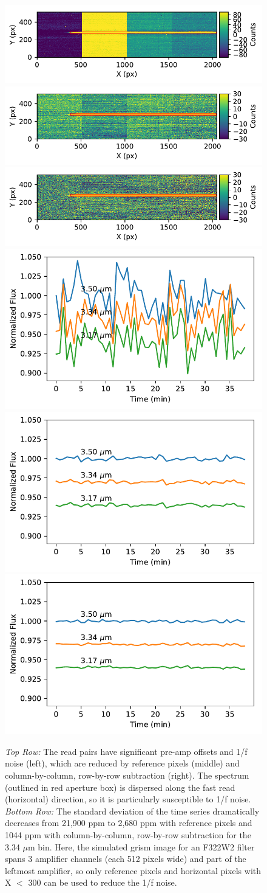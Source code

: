 \documentclass[]{aastex62}
\begin{document}
\begin{figure}[!hbtp]
\centering
\includegraphics[width=.32\columnwidth]{spec_aps_pairwiseSubNoRed_otisLongDarkSimGrism.pdf}
\includegraphics[width=.32\columnwidth]{spec_aps_pairwiseSubRed_covWeights_otisLongDarkSimGrism.pdf}
\includegraphics[width=.32\columnwidth]{spec_aps_pairwiseSub_backsub_otisLongDarkSimGrism.pdf}
\includegraphics[width=.32\columnwidth]{tser_pairwiseSub_noRed01.pdf}
\includegraphics[width=.32\columnwidth]{tser_pairwiseSubRed.pdf}
\includegraphics[width=.32\columnwidth]{tser_pairwiseSubRed_backsub.pdf}
\caption{{\it Top Row:} The read pairs have significant pre-amp offsets and 1/f noise (left), which are reduced by reference pixels (middle) and column-by-column, row-by-row subtraction (right).
The spectrum (outlined in red aperture box) is dispersed along the fast read (horizontal) direction, so it is particularly susceptible to 1/f noise.
{\it Bottom Row:} The standard deviation of the time series dramatically decreases from 21,900 ppm to 2,680 ppm with reference pixels and 1044 ppm with column-by-column, row-by-row subtraction for the 3.34 $\mu$m bin.
Here, the simulated grism image for an F322W2 filter spans 3 amplifier channels (each 512 pixels wide) and part of the leftmost amplifier, so only reference pixels and horizontal pixels with X $<$ 300 can be used to reduce the 1/f noise.
}\label{fig:longDarkGrism}
\end{figure}
\end{document}
